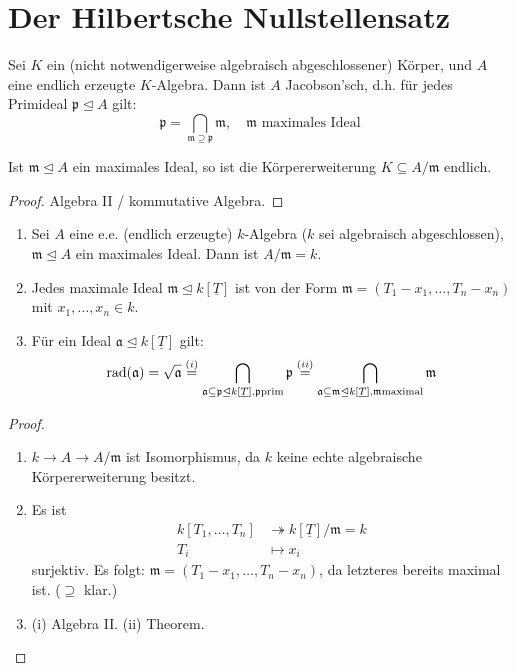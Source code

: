 
\section{Der Hilbertsche Nullstellensatz}
\label{sec:nullstellensatz}
\begin{prop}
  \label{prop:nullstellensatz}
  Sei $K$ ein (nicht notwendigerweise algebraisch abgeschlossener) Körper,
  und $A$ eine endlich erzeugte $K$-Algebra. Dann ist $A$ Jacobson'sch,
  d.h. für jedes Primideal $\mathfrak{p}\unlhd A$ gilt:
  \[
    \mathfrak{p}=\bigcap_{\mathfrak{m}\supseteq\mathfrak{p}}\mathfrak{m},\quad\mathfrak{m}\text{ maximales Ideal}
  \]

  Ist $\mathfrak{m}\unlhd A$ ein maximales Ideal, so ist die Körpererweiterung
  $K\subseteq A/\mathfrak{m}$ endlich.
\end{prop}
\begin{proof}
  Algebra II / kommutative Algebra.
\end{proof}
\begin{cor}
  \label{cor:nullstellensatz}
  \mbox{}
  \begin{enumerate}
  \item Sei $A$ eine e.e. (endlich erzeugte) $k$-Algebra ($k$ sei algebraisch
    abgeschlossen), $\mathfrak{m}\unlhd A$ ein maximales Ideal. Dann
    ist $A/\mathfrak{m}=k$. 
  \item Jedes maximale Ideal $\mathfrak{m}\unlhd k[\underline{T}]$ ist von der
    Form $\mathfrak{m}=(T_{1}-x_{1},\ldots,T_{n}-x_{n})$ mit $x_{1},\ldots,x_{n}\in k$.
  \item Für ein Ideal  $\mathfrak{a}\unlhd k[\underline{T}]$ gilt:
    \[
      \operatorname{rad}(\mathfrak{a})=\sqrt{\mathfrak{a}}\overset{(i)}{=}\bigcap_{\mathfrak{a}\subseteq\mathfrak{p}\unlhd k[\underline{T}], \mathfrak{p} \text{prim}}\mathfrak{p}\overset{(ii)}{=}\bigcap_{\mathfrak{a}\subseteq\mathfrak{m}\unlhd k[\underline{T}], \mathfrak{m} \text{maximal}}\mathfrak{m}
    \]
  \end{enumerate}
\end{cor}
\begin{proof}
  \mbox{}
  \begin{enumerate}
  \item $k\rightarrow A\rightarrow A/\mathfrak{m}$ ist Isomorphismus,  da
    $k$ keine echte algebraische Körpererweiterung besitzt.
  \item Es ist
    \begin{align*}
      k[T_{1},\ldots,T_{n}] & \twoheadrightarrow k[\underline{T}]/\mathfrak{m}=k\\
      T_{i} & \mapsto x_{i}
    \end{align*}
    surjektiv. Es folgt: $\mathfrak{m}=(T_{1}-x_{1},\ldots,T_{n}-x_{n})$, da letzteres
    bereits maximal ist. ($\supseteq$ klar.)
  \item (i) Algebra II. (ii) Theorem.
  \end{enumerate}
\end{proof}

